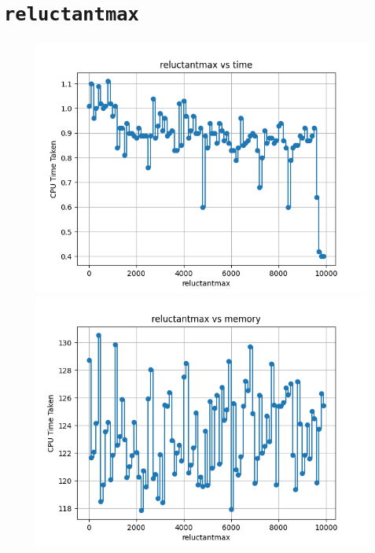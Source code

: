 \documentclass{article}
\begin{document}
    \section*{\texttt{reluctantmax}}
    \begin{figure}[H]
        \centering
        \begin{minipage}{0.45\textwidth}
            \centering
            \includegraphics[width = \linewidth]{reluctantmax-0.png}
        \end{minipage}
        \hfill
        \begin{minipage}{0.45\textwidth}
            \centering
            \includegraphics[width = \linewidth]{reluctantmax-1.png}
        \end{minipage}
    \end{figure}
\end{document}
